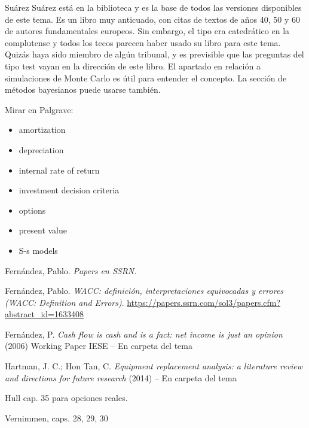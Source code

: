 \documentclass{nuevotema}
\begin{document}
Suárez Suárez está en la biblioteca y es la base de todos las versiones disponibles de este tema. Es un libro muy anticuado, con citas de textos de años 40, 50 y 60 de autores fundamentales europeos. Sin embargo, el tipo era catedrático en la complutense y todos los tecos parecen haber usado su libro para este tema. Quizás haya sido miembro de algún tribunal, y es previsible que las preguntas del tipo test vayan en la dirección de este libro. El apartado en relación a simulaciones de Monte Carlo es útil para entender el concepto. La sección de métodos bayesianos puede usarse también.

Mirar en Palgrave:
\begin{itemize}
    \item amortization
    \item depreciation
    \item internal rate of return
    \item investment decision criteria
    \item options
    \item present value
    \item S-s models
\end{itemize}




Fernández, Pablo. \textit{Papers en SSRN.}

Fernández, Pablo. \textit{WACC: definición, interpretaciones equivocadas y errores (WACC: Definition and Errors)}. \url{https://papers.ssrn.com/sol3/papers.cfm?abstract_id=1633408}

Fernández, P. \textit{Cash flow is cash and is a fact: net income is just an opinion} (2006) Working Paper IESE -- En carpeta del tema

Hartman, J. C.; Hon Tan, C. \textit{Equipment replacement analysis: a literature review and directions for future research} (2014) -- En carpeta del tema

Hull cap. 35 para opciones reales.

Vernimmen, caps. 28, 29, 30
\end{document}
